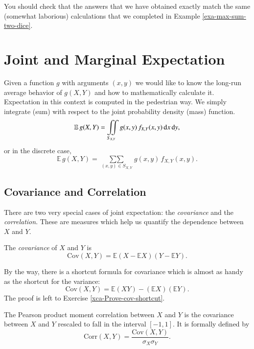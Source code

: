 \documentclass[captions=tableheading]{scrbook}
\begin{document}
You should check that the answers that we have obtained exactly match the same (somewhat laborious) calculations that we completed in Example \ref{exa-max-sum-two-dice}.
\section{Joint and Marginal Expectation}
\label{sec-7-2}
\label{sec-Joint-and-Marginal-Expectation}


Given a function \(g\) with arguments \((x,y)\) we would like to know the long-run average behavior of \(g(X,Y)\) and how to mathematically calculate it. Expectation in this context is computed in the pedestrian way. We simply integrate (sum) with respect to the joint probability density (mass) function.
\begin{equation}
\mathbb{E}\, g(X,Y)=\iintop_{S_{X,Y}}g(x,y)\, f_{X,Y}(x,y)\,\mathrm{d} x\,\mathrm{d} y,
\end{equation}
or in the discrete case,
\begin{equation}
\mathbb{E}\, g(X,Y)=\mathop{\sum\sum}\limits _{(x,y)\in S_{X,Y}}g(x,y)\, f_{X,Y}(x,y).
\end{equation}
\subsection{Covariance and Correlation}
\label{sec-7-2-1}


There are two very special cases of joint expectation: the \emph{covariance} and the \emph{correlation}. These are measures which help us quantify the dependence between \(X\) and \(Y\). 

\begin{defn}
The \emph{covariance} of \(X\) and \(Y\) is
\begin{equation}
\mbox{Cov}(X,Y)=\mathbb{E}(X-\mathbb{E} X)(Y-\mathbb{E} Y).
\end{equation}
\end{defn}

By the way, there is a shortcut formula for covariance which is almost as handy as the shortcut for the variance:
\begin{equation}
\mbox{Cov}(X,Y)=\mathbb{E}(XY)-(\mathbb{E} X)(\mathbb{E} Y).
\end{equation}
The proof is left to Exercise \ref{xca-Prove-cov-shortcut}.

The Pearson product moment correlation between \(X\) and \(Y\) is the covariance between \(X\) and \(Y\) rescaled to fall in the interval \([-1,1]\). It is formally defined by 
\begin{equation}
\mbox{Corr}(X,Y)=\frac{\mbox{Cov}(X,Y)}{\sigma_{X}\sigma_{Y}}.
\end{equation}
\end{document}
